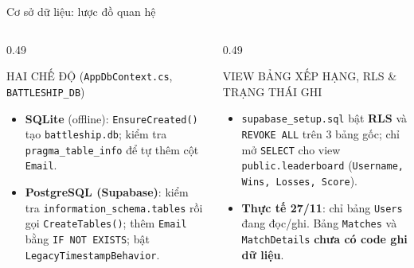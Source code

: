 \documentclass[aspectratio=169,9pt]{beamer}
\newenvironment{haicot}[1]{\begin{columns}[T,onlytextwidth]\begin{column}{#1\textwidth}}{\end{column}\end{columns}}
\newcommand{\sang}[1]{\end{column}\begin{column}{#1\textwidth}}
\begin{document}
\begin{frame}[t,label=db_erd]{Cơ sở dữ liệu: lược đồ quan hệ}
{%
  }
  \vspace{0.05cm}
  \begin{haicot}{0.49}
    \begin{khung}[equal height group=dbe]{HAI CHẾ ĐỘ (\texttt{AppDbContext.cs}, \texttt{BATTLESHIP\_DB})}
      \begin{itemize}\setlength{\itemsep}{0.5pt}
        \item \textbf{SQLite} (offline): \texttt{EnsureCreated()} tạo \texttt{battleship.db}; kiểm tra \texttt{pragma\_table\_info} để tự thêm cột \texttt{Email}.
        \item \textbf{PostgreSQL (Supabase)}: kiểm tra \texttt{information\_schema.tables} rồi gọi \texttt{CreateTables()}; thêm \texttt{Email} bằng \texttt{IF NOT EXISTS}; bật \texttt{LegacyTimestampBehavior}.
      \end{itemize}
    \end{khung}
  \sang{0.49}
    \begin{luuy}[equal height group=dbe]{VIEW BẢNG XẾP HẠNG, RLS \& TRẠNG THÁI GHI}
      \begin{itemize}\setlength{\itemsep}{0.5pt}
        \item \texttt{supabase\_setup.sql} bật \textbf{RLS} và \texttt{REVOKE ALL} trên 3 bảng gốc; chỉ mở \texttt{SELECT} cho view \texttt{public.leaderboard} (\texttt{Username, Wins, Losses, Score}).
        \item \textbf{Thực tế 27/11}: chỉ bảng \texttt{Users} đang đọc/ghi. Bảng \texttt{Matches} và \texttt{MatchDetails} \textbf{chưa có code ghi dữ liệu}.
      \end{itemize}
    \end{luuy}
  \end{haicot}
\end{frame}
\end{document}
